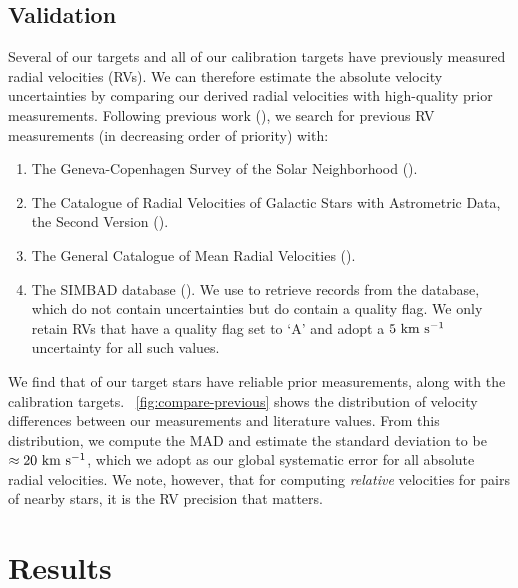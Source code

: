 \documentclass[modern, letterpaper]{aastex61}
\begin{document}
\subsection{Validation}

Several of our targets and all of our calibration targets have previously
measured radial velocities (RVs).
We can therefore estimate the absolute velocity uncertainties by comparing our
derived radial velocities with high-quality prior measurements.
Following previous work (\citealt{Shaya:2011}), we search for previous RV
measurements (in decreasing order of priority) with:
\begin{enumerate}
  \item The Geneva-Copenhagen Survey of the Solar Neighborhood
  (\citealt{Nordstrom:2004}).
  \item The Catalogue of Radial Velocities of Galactic Stars with Astrometric
  Data, the Second Version (\citealt{Kharchenko:2007}).
  \item The General Catalogue of Mean Radial Velocities
  (\citealt{Barbier-Brossat:2000}).
  \item The SIMBAD database (\citealt{Wenger:2000}). We use 
  to retrieve records from the database, which do not contain uncertainties but
  do contain a quality flag. We only retain RVs that have a quality flag set to
  `A' and adopt a $5~\mathrm{km}~\mathrm{s}^{-1}$ uncertainty for all such values.
\end{enumerate}
We find that  of our target stars have reliable prior measurements,
along with the  calibration targets.
\figurename~\ref{fig:compare-previous} shows the distribution of velocity
differences between our measurements and literature values.
From this distribution, we compute the MAD and estimate the standard deviation
to be $\approx 20~\mathrm{km}~\mathrm{s}^{-1}$, which we adopt as our global systematic error for all
absolute radial velocities.
We note, however, that for computing \emph{relative} velocities for pairs of
nearby stars, it is the RV precision that matters.


\section{Results}
\end{document}
